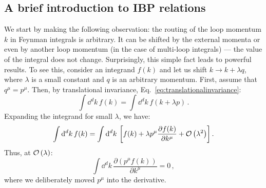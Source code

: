 \documentclass[main.tex]{subfiles}
\begin{document}
\subsection{A brief introduction to IBP relations} \label{sec:ibpintro}
We start by making the following observation: the routing of the loop momentum $k$ in Feynman integrals is arbitrary. It can be shifted by the external momenta or even by another loop momentum (in the case of multi-loop integrals) --- the value of the integral does not change. Surprisingly, this simple fact leads to powerful results. To see this, consider an integrand $f(k)$ and let us shift $k \rightarrow k + \lambda q$, where $\lambda$ is a small constant and $q$ is an arbitrary momentum. First, assume that $q^\mu = p^\mu$. Then, by translational invariance, Eq.~\ref{eq:translationalinvariance}:
\begin{equation}
    \int \dd^d k\, f(k) = \int \dd^d k\, f(k+\lambda p) \,.
\end{equation}
Expanding the integrand for small $\lambda$, we have:
\begin{equation}
    \int \mathrm{d}^d k\, f(k) = \int \mathrm{d}^d k\, \left[ f(k) + \lambda p^\mu \frac{\partial f(k)}{\partial k^\mu} + \mathcal{O}\left(\lambda^2\right) \right].
\end{equation}
Thus, at $\mathcal{O}\left(\lambda\right)$:
\begin{equation} \label{eq:IBPpshift}
    \int \dd^d k\, \frac{\partial (p^\mu f(k))}{\partial k^\mu} = 0\,,
\end{equation}
where we deliberately moved $p^\mu$ into the derivative.
\end{document}
